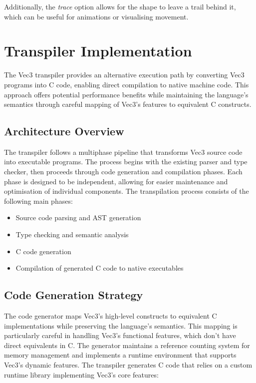 Additionally, the \textit{trace} option allows for the shape to leave a trail behind it, which can be useful for
animations or visualising movement.

\section{Transpiler Implementation} \label{sec:transpiler-implementation}
The Vec3 transpiler provides an alternative execution path by converting Vec3 programs into C code, enabling direct compilation to native machine code.
This approach offers potential performance benefits while maintaining the language's semantics through careful mapping of Vec3's features to equivalent C constructs.

\subsection{Architecture Overview}\label{subsec:architecture-overview}
The transpiler follows a multiphase pipeline that transforms Vec3 source code into executable programs.
The process begins with the existing parser and type checker, then proceeds through code generation and compilation phases.
Each phase is designed to be independent, allowing for easier maintenance and optimisation of individual components.
The transpilation process consists of the following main phases:

\begin{itemize}[nolistsep]
\item Source code parsing and AST generation
\item Type checking and semantic analysis
\item C code generation
\item Compilation of generated C code to native executables
\end{itemize}

\subsection{Code Generation Strategy}\label{subsec:code-generation-strategy}
The code generator maps Vec3's high-level constructs to equivalent C implementations while preserving the language's semantics. 
This mapping is particularly careful in handling Vec3's functional features, which don't have direct equivalents in C. The generator maintains a reference counting system for memory management and implements a runtime environment that supports Vec3's dynamic features.
The transpiler generates C code that relies on a custom runtime library implementing Vec3's core features:

